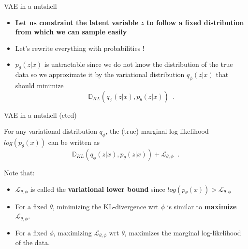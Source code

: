 \documentclass{beamer}
\begin{document}
\begin{frame}{VAE in a nutshell}
    \begin{itemize}
        \item \textcolor{cGreen!80}{\textbf{Let us constraint the latent variable $z$ to follow a fixed distribution from which we can sample easily}}
        \item Let's rewrite everything with probabilities !
        \begin{figure}
        \centering
    \end{figure}
    \item $p_\theta(z|x)$ is untractable since we do not know the distribution of the true data so we approximate it by the \textcolor{cOrange}{variational distribution $q_\phi(z|x)$} that should minimize
    \[ \mathbb{D}_{KL}(q_\phi(z|x), p_\theta(z|x)) \;\;. \] 
    
    \end{itemize}
    
\end{frame}

\begin{frame}{VAE in a nutshell (cted)}
    \begin{lemma}
    For any variational distribution $q_\phi$, the (true) marginal log-likelihood $log(p_\theta(x))$ can be written as
        \[ \mathbb{D}_{KL}(q_\phi(z|x), p_\theta(z|x)) + \mathcal{L}_{\theta, \phi}\;\;. \]
    \end{lemma}

Note that:
    \begin{itemize}
        \item $\mathcal{L}_{\theta, \phi}$ is called the \textbf{variational lower bound} since $log(p_\theta(x)) > \mathcal{L}_{\theta, \phi}$
        \item For a fixed $\theta$, minimizing the KL-divergence wrt $\phi$ is similar to \textbf{maximize $\mathcal{L}_{\theta, \phi}$}.
        \item For a fixed $\phi$, maximizing $\mathcal{L}_{\theta, \phi}$ wrt $\theta$, maximizes the marginal log-likelihood of the data.
    \end{itemize}
\end{frame}
\end{document}
